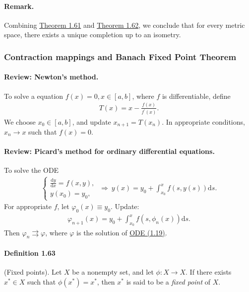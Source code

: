 \documentclass{article}
\begin{document}
\paragraph{Remark.} Combining \hyperref[thm:1.61]{Theorem 1.61} and \hyperref[thm:1.62]{Theorem 1.62}, we conclude that for every metric space, there exists a unique completion up to an isometry.

\subsubsection{Contraction mappings and Banach Fixed Point Theorem}
\paragraph{Review: Newton's method.} To solve a equation $f(x)=0,x\in[a,b]$, where $f$ is differentiable, define
\begin{align*}
	T(x) = x - \frac{f(x)}{f^\prime(x)}.
\end{align*}
We choose $x_0\in[a,b]$, and update $x_{n+1}=T(x_n)$. In appropriate conditions, $x_n\to x$ such that $f(x)=0$.
\paragraph{Review: Picard's method for ordinary differential equations.} To solve the ODE
\begin{align*}
	\begin{cases}
		\frac{\mathrm{d}y}{\mathrm{d}x} = f(x,y),\\
		y(x_0) = y_0, 
	\end{cases}\tag{1.19}\label{eq:1.19}
\ \Rightarrow\ 
	y(x) = y_0 + \int_{x_0}^x f(s,y(s))\mathrm{d}s.
\end{align*}
For appropriate $f$, let $\varphi_0(x)\equiv y_0$. Update:
\begin{align*}
	\varphi_{n+1}(x)=y_0 + \int_{x_0}^x f(s,\phi_n(x))\mathrm{d}s.
\end{align*}
Then $\varphi_n\rightrightarrows\varphi$, where $\varphi$ is the solution of \hyperref[eq:1.19]{ODE (1.19)}.

\paragraph{Definition 1.63\label{def:1.63}} (Fixed points). Let $X$ be a nonempty set, and let $\phi:X\to X$. If there exists $x^*\in X$ such that $\phi(x^*)=x^*$, then $x^*$ is said to be a \textit{fixed point} of $X$.
\end{document}

